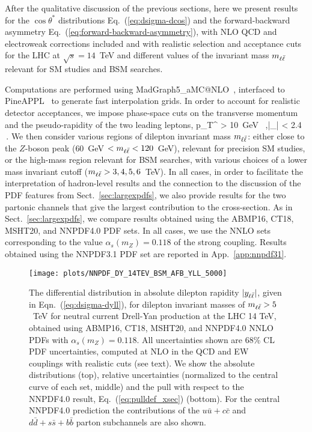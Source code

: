 
After the qualitative discussion of the previous sections, here we
present results for the $\cos\theta^*$
distributions Eq.~(\ref{eq:dsigma-dcos}) and the
forward-backward asymmetry Eq.~(\ref{eq:forward-backward-asymmetry}), with
NLO QCD and electroweak corrections included and
with realistic selection and acceptance cuts for the LHC at $\sqrt{s} = 14$~TeV
and different values of the invariant mass $m_{\ell\bar{\ell}}$ relevant for SM
studies and BSM searches.

Computations are performed using {\sc\small MadGraph5\_aMC@NLO}~\cite{Alwall:2014hca},
interfaced to {\sc\small PineAPPL}~\cite{Carrazza:2020gss,christopher_schwan_2022_7023438} to generate
fast interpolation grids.
%
In order to account for realistic detector acceptances,
we impose phase-space cuts on the transverse momentum and the pseudo-rapidity of the two
leading leptons,
\be
p_T^{\ell} > 10~{\rm GeV}  \, ,\qquad |\eta_{\ell}| < 2.4 \,.
\ee
We then consider various regions of dilepton invariant mass $m_{\ell\bar{\ell}}$:
either close to the $Z$-boson peak ($60$~GeV $< m_{\ell\bar{\ell}} < 120$~GeV),
relevant for precision SM studies, or the
high-mass region relevant for BSM searches, with  various choices of a
lower mass invariant cutoff ($m_{\ell\bar{\ell}} > 3,4,5,6$~TeV).
%
In all cases, in order to facilitate the interpretation of
hadron-level results  and the connection to
the discussion of the PDF features from Sect.~\ref{sec:largexpdfs},
we also provide results for the two partonic channels that give the
largest contribution to the cross-section.
%
As in Sect.~\ref{sec:largexpdfs}, we compare results obtained using
the  ABMP16, CT18, MSHT20, and NNPDF4.0 PDF sets.
%
In all cases, we
use the  NNLO sets corresponding to the value $\alpha_s(m_Z)=0.118$
of the strong coupling.
%
Results obtained using the NNPDF3.1 PDF set are reported in App.~\ref{app:nnpdf31}.

\begin{figure}[!t]
 \centering
 \texttt{[image: plots/NNPDF\_DY\_14TEV\_BSM\_AFB\_YLL\_5000]}
 \caption{The differential distribution in absolute dilepton rapidity $|y_{\ell\bar{\ell}}|$, given in
Eqn.~(\ref{eq:dsigma-dyll}),
for dilepton invariant masses of $m_{\ell\bar{\ell}} > 5$~TeV
for neutral current Drell-Yan production at the
LHC 14 TeV,
obtained using ABMP16, CT18, MSHT20, and NNPDF4.0 NNLO PDFs with $\alpha_s(m_Z)=0.118$.
%
All
uncertainties shown are 68\% CL PDF uncertainties, computed at NLO
in the QCD and EW couplings with realistic cuts (see text).
We show the absolute distributions (top), relative uncertainties (normalized
to the central curve of each set, middle) and the pull with respect to the
NNPDF4.0 result, Eq.~(\ref{eq:pulldef_xsec}) (bottom).
%
For the central NNPDF4.0 prediction
the contributions of the $u\bar{u}+c\bar{c}$ and $d\bar{d}+s\bar{s}+b\bar{b}$
parton subchannels are also shown.
 \label{fig:CMS_DY_14TEV_MLL_5000_rap}}
\end{figure}

